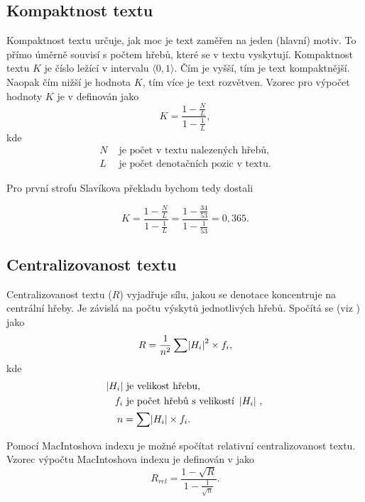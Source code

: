 \documentclass[dp.tex]{subfiles}
\begin{document}
\subsection{Kompaktnost textu}
Kompaktnost textu určuje, jak moc je text zaměřen na jeden (hlavní) motiv. To přímo úměrně souvisí s počtem hřebů, které se v textu vyskytují. Kompaktnost textu $K$ je číslo ležící v intervalu $\langle0, 1\rangle$. Čím je vyšší, tím je text kompaktnější. Naopak čím nižší je hodnota $K$, tím více je text rozvětven. Vzorec pro výpočet hodnoty $K$ je v \cite[str. 303]{Wimmer2003} definován jako
\begin{equation}
K=\frac{1-\frac{N}{L}}{1-\frac{1}{L}},
\end{equation}
kde 
\begin{align*}
      N & \text{ je počet v textu nalezených hřebů,}\\
      L & \text{ je počet denotačních pozic v textu.}
\end{align*}     

Pro první strofu Slavíkova překladu bychom tedy dostali

\begin{equation}
K=\frac{1-\frac{N}{L}}{1-\frac{1}{L}} = \frac{1-\frac{34}{53}}{1-\frac{1}{53}}=0{,}365.
\end{equation}

\subsection{Centralizovanost textu}
Centralizovanost textu ($R$) vyjadřuje sílu, jakou se denotace koncentruje na centrální hřeby. Je závislá na počtu výskytů jednotlivých hřebů. Spočítá se (viz \cite[str. 303]{Wimmer2003}) jako
\begin{equation}
R=\frac{1}{n^2}\sum{ \abs{H_i}^2 \times f_i},
\end{equation}
kde 
\begin{align*}
      \abs{H_i} & \text{ je velikost hřebu,}\\
      f_i & \text{ je počet hřebů s velikostí \abs{H_i},}\\
      n&=\sum{ \abs{H_i}\times f_i }.
\end{align*}     

Pomocí MacIntoshova indexu je možné spočítat relativní centralizovanost textu. Vzorec výpočtu MacIntoshova indexu je definován v \cite[str. 304]{Wimmer2003} jako
\begin{equation}
R_{rel}=\frac{1-\sqrt{R}}{1-\frac{1}{\sqrt{n}}}.
\end{equation}
\end{document}
